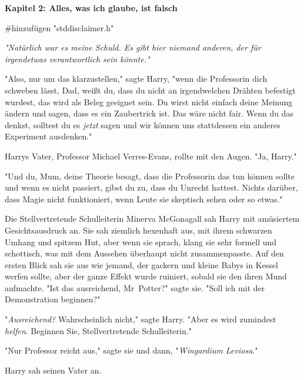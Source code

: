 

\hypertarget{alles-was-ich-glaube-ist-falsch}{%

\textbf{Kapitel 2: Alles, was ich glaube, ist falsch}

\#hinzufügen "stddisclaimer.h"

\later

\emph{"Natürlich war es meine Schuld. Es gibt hier niemand anderen, der für irgendetwas verantwortlich sein könnte."}

\later

"Also, nur um das klarzustellen," sagte Harry, "wenn die Professorin dich schweben lässt, Dad, weißt du, dass du nicht an irgendwelchen Drähten befestigt wurdest, das wird als Beleg geeignet sein. Du wirst nicht einfach deine Meinung ändern und sagen, dass es ein Zaubertrick ist. Das wäre nicht fair. Wenn du das denkst, solltest du es \emph{jetzt} sagen und wir können uns stattdessen ein anderes Experiment ausdenken."

Harrys Vater, Professor Michael Verres-Evans, rollte mit den Augen. "Ja, Harry."

"Und du, Mum, deine Theorie besagt, dass die Professorin das tun können sollte und wenn es nicht passiert, gibst du zu, dass du Unrecht hattest. Nichts darüber, dass Magie nicht funktioniert, wenn Leute sie skeptisch sehen oder so etwas."

Die Stellvertretende Schulleiterin Minerva McGonagall sah Harry mit amüsiertem Gesichtsausdruck an. Sie sah ziemlich hexenhaft aus, mit ihrem schwarzen Umhang und spitzem Hut, aber wenn sie sprach, klang sie sehr formell und schottisch, was mit dem Aussehen überhaupt nicht zusammenpasste. Auf den ersten Blick sah sie aus wie jemand, der gackern und kleine Babys in Kessel werfen sollte, aber der ganze Effekt wurde ruiniert, sobald sie den ihren Mund aufmachte. "Ist das ausreichend, Mr~Potter?" sagte sie. "Soll ich mit der Demonstration beginnen?"

"\emph{Ausreichend?} Wahrscheinlich nicht," sagte Harry. "Aber es wird zumindest \emph{helfen}. Beginnen Sie, Stellvertretende Schulleiterin."

"Nur Professor reicht aus," sagte sie und dann, "\emph{Wingardium Leviosa}."

Harry sah seinen Vater an.

}
